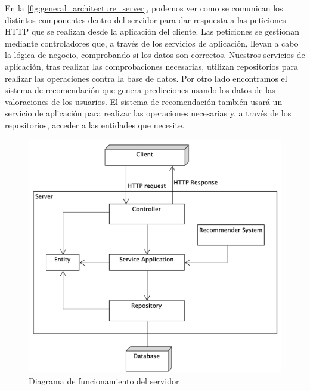  En la \autoref{fig:general_architecture_server}, podemos ver como se comunican
 los distintos componentes dentro del servidor para dar respuesta a las peticiones
 HTTP que se realizan desde la aplicación del cliente.
Las peticiones se gestionan mediante controladores que, a través de los servicios de
 aplicación, llevan a cabo la lógica de negocio, comprobando si los datos son correctos.  
 Nuestros servicios de aplicación, tras realizar las comprobaciones necesarias, utilizan 
 repositorios para realizar las operaciones contra la base de datos. Por otro lado encontramos 
 el sistema de recomendación que genera predicciones usando los datos de las valoraciones de los usuarios. 
 El sistema de recomendación también usará un servicio de aplicación para realizar las operaciones necesarias y, 
 a través de los repositorios, acceder a las entidades que necesite. 
\begin{figure}[H]
    \centering
    \includegraphics[width=6in]{figures/chapter-4/general_server_architecture.png}
    \caption{Diagrama de funcionamiento del servidor}
    \label{fig:general_architecture_server}
\end{figure}
